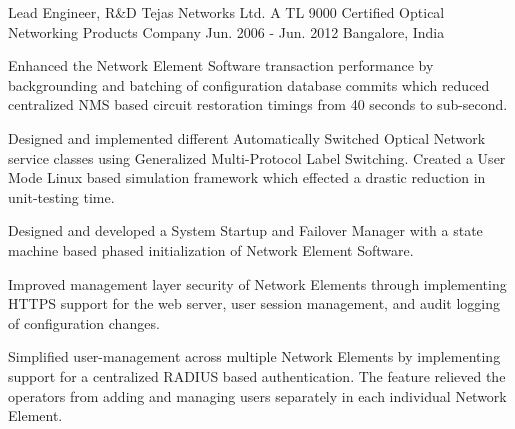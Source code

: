 \begin{cventries}
  \expentry
    {Lead Engineer, R\&D} %
    {Tejas Networks Ltd.} %
    {A TL 9000 Certified Optical Networking Products Company} %
    {Jun. 2006 - Jun. 2012} %
    {Bangalore, India} %
    {
      \begin{cvitems} %
        \item {Enhanced the Network Element Software transaction performance by backgrounding and batching of configuration database commits which reduced centralized NMS based circuit restoration timings from 40 seconds to sub-second.}
        \item {Designed and implemented different Automatically Switched Optical Network service classes using Generalized Multi-Protocol Label Switching. Created a User Mode Linux based simulation framework which effected a drastic reduction in unit-testing time.}
	\item {Designed and developed a System Startup and Failover Manager with a state machine based phased initialization of Network Element Software.}
	\item {Improved management layer security of Network Elements through implementing HTTPS support for the web server, user session management, and audit logging of configuration changes.}
	\item {Simplified user-management across multiple Network Elements by implementing support for a centralized RADIUS based authentication. The feature relieved the operators from adding and managing users separately in each individual Network Element.}
      \end{cvitems}
    }

\end{cventries}
